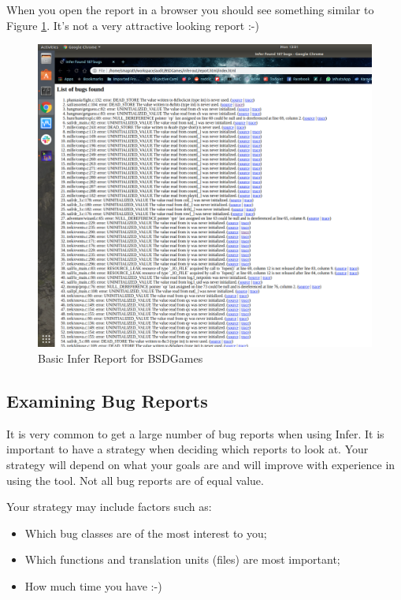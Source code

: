 When you open the report in a browser you should see something similar to Figure \ref{fig:screen-one}.
It's not a very attractive looking report  :-)

\begin{figure}
	\centering
	\includegraphics[width=\linewidth]{img/screen-one}
	\caption[Basic Report]{Basic Infer Report for BSDGames}
	\label{fig:screen-one}
\end{figure}

\vspace{1cm}

\subsection{Examining Bug Reports}

It is very common to get a large number of bug reports when using Infer. 
It is important to have a strategy when deciding which reports to look at.
Your strategy will depend on what your goals are and will improve with experience
in using the tool. Not all bug reports are of equal value.

Your strategy may include factors such as:
\begin{itemize}
	\item Which bug classes are of the most interest to you;
	\item Which functions and translation units (files) are most important;
	\item How much time you have :-)
\end{itemize}

